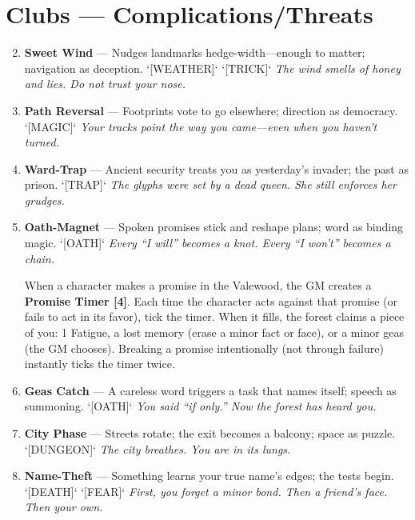 \section*{Clubs --- Complications/Threats}
\label{sec:valewood-complications}
\begin{enumerate}
\setcounter{enumi}{1}
\item \textbf{Sweet Wind} --- Nudges landmarks hedge-width---enough to matter; navigation as deception. `[WEATHER]` `[TRICK]`
  \hfill \textit{The wind smells of honey and lies. Do not trust your nose.}
\item \textbf{Path Reversal} --- Footprints vote to go elsewhere; direction as democracy. `[MAGIC]`
  \hfill \textit{Your tracks point the way you came---even when you haven't turned.}
\item \textbf{Ward-Trap} --- Ancient security treats you as yesterday's invader; the past as prison. `[TRAP]`
  \hfill \textit{The glyphs were set by a dead queen. She still enforces her grudges.}
\item \textbf{Oath-Magnet} --- Spoken promises stick and reshape plans; word as binding magic. `[OATH]`
  \hfill \textit{Every ``I will'' becomes a knot. Every ``I won't'' becomes a chain.}
  \begin{tcolorbox}[colback=red!3,title=Oath-Magnet Mechanics,breakable]
    When a character makes a promise in the Valewood, the GM creates a \textbf{Promise Timer [4]}. Each time the character acts against that promise (or fails to act in its favor), tick the timer. When it fills, the forest claims a piece of you: 1 Fatigue, a lost memory (erase a minor fact or face), or a minor geas (the GM chooses). Breaking a promise intentionally (not through failure) instantly ticks the timer twice.
  \end{tcolorbox}
\item \textbf{Geas Catch} --- A careless word triggers a task that names itself; speech as summoning. `[OATH]`
  \hfill \textit{You said ``if only.'' Now the forest has heard you.}
\item \textbf{City Phase} --- Streets rotate; the exit becomes a balcony; space as puzzle. `[DUNGEON]`
  \hfill \textit{The city breathes. You are in its lungs.}
\item \textbf{Name-Theft} --- Something learns your true name's edges; the tests begin. `[DEATH]` `[FEAR]`
  \hfill \textit{First, you forget a minor bond. Then a friend's face. Then your own.}
  \begin{tcolorbox}[colback=red!3,title=Name-Theft Mechanics,breakable]

\end{tcolorbox}
\end{enumerate}
